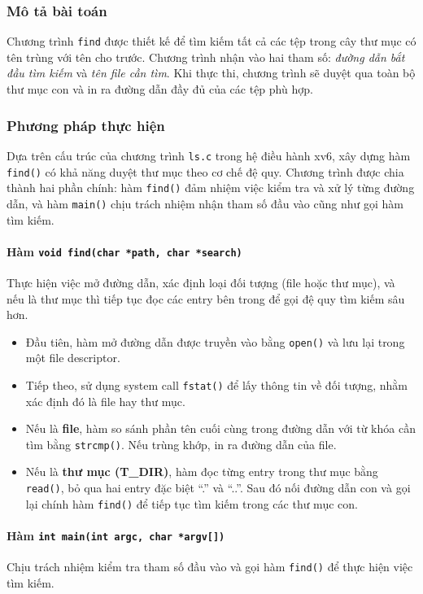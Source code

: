 \subsubsection{Mô tả bài toán}
Chương trình \texttt{find} được thiết kế để tìm kiếm tất cả các tệp trong cây thư mục có tên trùng với tên cho trước. 
Chương trình nhận vào hai tham số: \textit{đường dẫn bắt đầu tìm kiếm} và \textit{tên file cần tìm}. 
Khi thực thi, chương trình sẽ duyệt qua toàn bộ thư mục con và in ra đường dẫn đầy đủ của các tệp phù hợp.

\subsubsection{Phương pháp thực hiện}
Dựa trên cấu trúc của chương trình \texttt{ls.c} trong hệ điều hành xv6, xây dựng hàm \texttt{find()} có khả năng duyệt thư mục theo cơ chế đệ quy. Chương trình được chia thành hai phần chính: hàm \texttt{find()} đảm nhiệm việc kiểm tra và xử lý từng đường dẫn, và hàm \texttt{main()} chịu trách nhiệm nhận tham số đầu vào cũng như gọi hàm tìm kiếm.
\paragraph{Hàm \texttt{void find(char *path, char *search)}}
Thực hiện việc mở đường dẫn, xác định loại đối tượng (file hoặc thư mục), và nếu là thư mục thì tiếp tục đọc các entry bên trong để gọi đệ quy tìm kiếm sâu hơn.
\begin{itemize}
    \item Đầu tiên, hàm mở đường dẫn được truyền vào bằng \texttt{open()} và lưu lại trong một file descriptor.
    \item Tiếp theo, sử dụng system call \texttt{fstat()} để lấy thông tin về đối tượng, nhằm xác định đó là file hay thư mục.
    \item Nếu là \textbf{file}, hàm so sánh phần tên cuối cùng trong đường dẫn với từ khóa cần tìm bằng \texttt{strcmp()}. Nếu trùng khớp, in ra đường dẫn của file.
    \item Nếu là \textbf{thư mục (T\_DIR)}, hàm đọc từng entry trong thư mục bằng \texttt{read()}, bỏ qua hai entry đặc biệt ``.'' và ``..''. Sau đó nối đường dẫn con và gọi lại chính hàm \texttt{find()} để tiếp tục tìm kiếm trong các thư mục con.
\end{itemize}

\paragraph{Hàm \texttt{int main(int argc, char *argv[])}}
Chịu trách nhiệm kiểm tra tham số đầu vào và gọi hàm \texttt{find()} để thực hiện việc tìm kiếm. 

